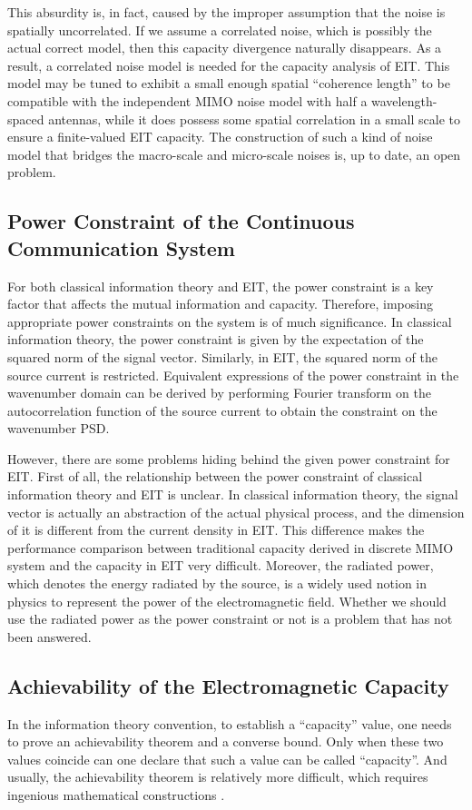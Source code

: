 \documentclass[journal,twocolumn]{IEEEtran}
\begin{document}
This absurdity is, in fact, caused by the improper assumption that the noise is spatially uncorrelated. If we assume a correlated noise, which is possibly the actual correct model, then this capacity divergence naturally disappears. 
As a result, a correlated noise model is needed for the capacity analysis of EIT. This model may be tuned to exhibit a small enough spatial ``coherence length'' to be compatible with the independent  MIMO noise model with half a wavelength-spaced antennas, while it does possess some spatial correlation in a small scale to ensure a finite-valued EIT capacity. 
The construction of such a kind of noise model that bridges the macro-scale and micro-scale noises is, up to date, an open problem. 

\subsection{Power Constraint of the Continuous Communication System}
For both classical information theory and EIT, the power constraint is a key factor that affects the mutual information and capacity. Therefore, imposing appropriate power constraints on the system is of much significance. In classical information theory, the power constraint is given by the expectation of the squared norm of the signal vector.  Similarly, in EIT, the squared norm of the source current is restricted. Equivalent expressions of the power constraint in the wavenumber domain can be derived by performing Fourier transform on the autocorrelation function of the source current to obtain the constraint on the wavenumber PSD. 


However, there are some problems hiding behind the given power constraint for EIT. First of all, the relationship between the power constraint of classical information theory and EIT is unclear. In classical information theory, the signal vector is actually an abstraction of the actual physical process, and the dimension of it is different from the current density in EIT. This difference makes the performance comparison between traditional capacity derived in discrete MIMO system and the capacity in EIT very difficult. Moreover, the radiated power, which denotes the energy radiated by the source, is a widely used notion in physics to represent the power of the electromagnetic field. Whether we should use the radiated power as the power constraint or not is a problem that has not been answered.


\subsection{Achievability of the Electromagnetic Capacity}
In the information theory convention, to establish a ``capacity'' value, one needs to prove an achievability theorem and a converse bound. Only when these two values coincide can one declare that such a value can be called ``capacity''. And usually, the achievability theorem is relatively more difficult, which requires ingenious mathematical constructions \cite{shannon1948mathematical}. 
\end{document}
